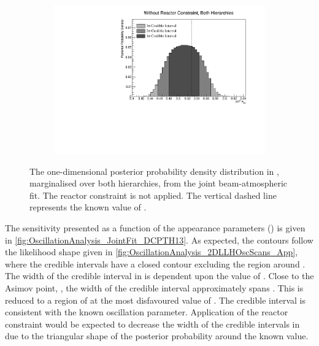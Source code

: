 \begin{figure}[h]
  \begin{subfigure}[t]{0.98\textwidth}
    \includegraphics[width=\textwidth, trim={0mm 0mm 0mm 0mm}, clip,page=1]{Figures/OA/JointFit/Contours_1D_th23_BH_1_woRC_UnSmeared_CredibleInterval.pdf}
  \end{subfigure}
  \caption{The one-dimensional posterior probability density distribution in , marginalised over both hierarchies, from the joint beam-atmospheric fit. The reactor constraint is not applied. The vertical dashed line represents the known value of .}
  \label{fig:OscillationAnalysis_JointFit_TH23}
\end{figure}

The sensitivity presented as a function of the appearance parameters () is given in \autoref{fig:OscillationAnalysis_JointFit_DCPTH13}. As expected, the contours follow the likelihood shape given in \autoref{fig:OscillationAnalysis_2DLLHOscScans_App}, where the \quickmath{2\sigma} credible intervals have a closed contour excluding the region around . The width of the \quickmath{3\sigma} credible interval in  is dependent upon the value of . Close to the Asimov point, , the width of the \quickmath{3\sigma} credible interval approximately spans . This is reduced to a region of  at the most disfavoured value of .
The \quickmath{1\sigma} credible interval is consistent with the known oscillation parameter. Application of the reactor constraint would be expected to decrease the width of the \quickmath{1\sigma} credible intervals in  due to the triangular shape of the posterior probability around the known value. 


